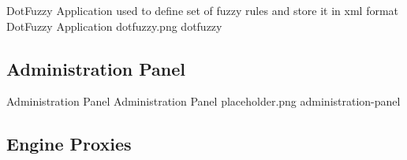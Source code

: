 \largeimg
{DotFuzzy Application used to define set of fuzzy rules and store it in xml format}
{DotFuzzy Application}
{dotfuzzy.png}
{dotfuzzy}


\subsection{Administration Panel}

\largeimg
{Administration Panel}
{Administration Panel}
{placeholder.png}
{administration-panel}

\subsection{Engine Proxies}





